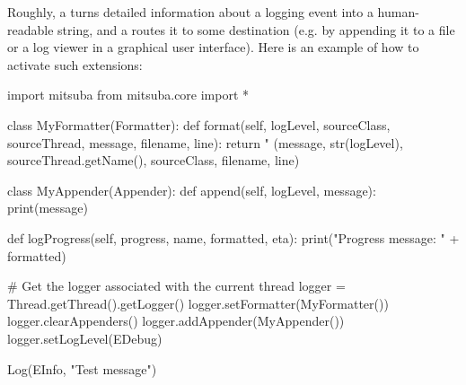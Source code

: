 Roughly, a  turns detailed
information about a logging event into a human-readable string, and a
 routes it to some destination (e.g. by appending it to
a file or a log viewer in a graphical user interface). Here is an example
of how to activate such extensions:
\begin{python}
import mitsuba
from mitsuba.core import *

class MyFormatter(Formatter):
	def format(self, logLevel, sourceClass, sourceThread, message, filename, line):
		return "%
				(message, str(logLevel), sourceThread.getName(), sourceClass, 
				 filename, line)

class MyAppender(Appender):
	def append(self, logLevel, message):
		print(message)

	def logProgress(self, progress, name, formatted, eta):
		print("Progress message: " + formatted)

# Get the logger associated with the current thread
logger = Thread.getThread().getLogger()
logger.setFormatter(MyFormatter())
logger.clearAppenders()
logger.addAppender(MyAppender())
logger.setLogLevel(EDebug)

Log(EInfo, "Test message")
\end{python}
